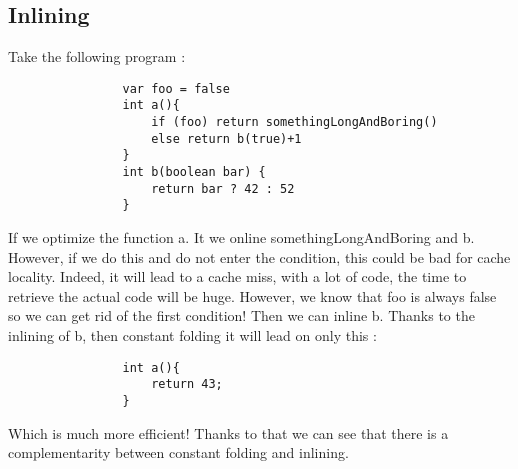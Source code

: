         \subsection{Inlining}
            Take the following program : 
            \begin{lstlisting}
                var foo = false
                int a(){
                    if (foo) return somethingLongAndBoring()
                    else return b(true)+1
                }
                int b(boolean bar) {
                    return bar ? 42 : 52
                }
            \end{lstlisting}
            If we optimize the function a. It we online somethingLongAndBoring
            and b. However, if we do this and do not enter the condition, this
            could be bad for cache locality. Indeed, it will lead to a cache
            miss, with a lot of code, the time to retrieve the actual code will
            be huge. However, we know that foo is always false so we can get rid
            of the first condition! Then we can inline b. Thanks to the inlining
            of b, then constant folding it will lead on only this : 
            \begin{lstlisting}
                int a(){
                    return 43;
                }
            \end{lstlisting}
            Which is much more efficient! Thanks to that we can see that there
            is a complementarity between constant folding and inlining.